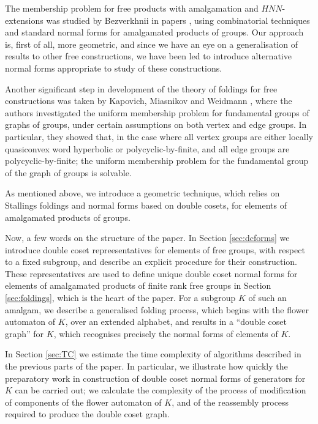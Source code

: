 \documentclass[a4paper,12pt]{article}
\numberwithin{equation}{section}
\numberwithin{figure}{section}
\begin{document}
The membership problem for free products with amalgamation and
$HNN$-extensions was studied by Bezverkhnii in papers
\cite{bez81,bez86,bez90,bez91}, using  combinatorial
techniques and standard normal forms for  amalgamated products of
groups. Our approach is, first of all, more geometric, and since
we have an eye on a generalisation of results to other free
constructions, we have been led to introduce alternative normal forms
 appropriate to
study of these constructions.

Another significant step in development of the theory of foldings for
free constructions
 was taken by Kapovich, Miasnikov and Weidmann
\cite{KMW03}, where the authors investigated the uniform membership
problem for fundamental groups of graphs of groups, under certain
assumptions on both vertex and edge groups. In particular, they
showed that, in the case where all vertex groups are either locally
quasiconvex word hyperbolic or polycyclic-by-finite, and all edge
groups are polycyclic-by-finite; the uniform membership problem for the
fundamental group of the graph of groups is solvable.

As mentioned above, we  introduce a  geometric
technique, which relies on Stallings foldings and
normal forms based on double cosets, for elements of amalgamated products of
groups.

Now, a few words on the structure of the paper. In Section
\ref{sec:dcforms} we introduce double coset repreesentatives for
elements of free groups, with respect to a fixed subgroup,
and
  describe an explicit procedure
 for their construction.
These representatives are used to define unique double coset normal forms
for elements of
amalgamated products of finite rank free groups in Section  \ref{sec:foldings}, which
 is the heart of the paper. For a subgroup $K$ of such an amalgam, we
describe a generalised folding process, which begins with the flower automaton
of $K$, over an extended alphabet, and results in
a ``double coset graph'' for $K$, which  recognises
precisely the  normal forms of elements of $K$.

In Section \ref{sec:TC} we estimate the time complexity of
algorithms described in the previous parts of the paper. In
particular, we illustrate how quickly the  preparatory
work in construction of  double coset normal forms of generators
for $K$  can be carried out; we calculate  the complexity of the process of
modification of
components of the flower automaton of $K$, and of the reassembly process required to
produce the double coset graph.
\end{document}
